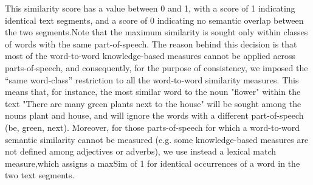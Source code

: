    This similarity score has a value between 0 and 1, with a score of 1 indicating identical text segments, and a score of 0 indicating no semantic overlap between the two segments.Note that the maximum similarity is sought only within classes of words with the same part-of-speech. The reason behind this decision is that most of the word-to-word knowledge-based measures cannot be applied across parts-of-speech, and consequently, for the purpose of consistency, we imposed the “same word-class” restriction to all the word-to-word similarity measures. This means that, for instance, the most similar word to the noun "flower" within the text "There are many green plants next to the house" will be sought among the nouns plant and house, and will ignore the words with a different part-of-speech (be, green, next). Moreover, for those parts-of-speech for which a word-to-word semantic similarity cannot be measured (e.g. some knowledge-based measures are not defined among adjectives or adverbs), we use instead a lexical match measure,which assigns a maxSim of 1 for identical occurrences of a word in the two text segments.
